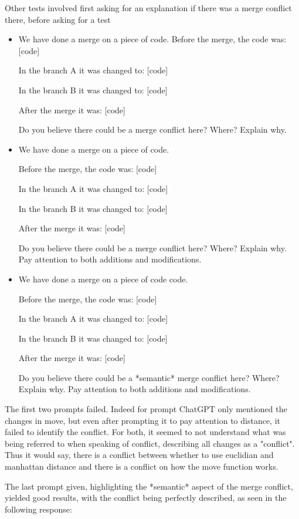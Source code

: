 Other tests involved first asking for an explanation if there was a merge conflict there, before asking for a test

\begin{itemize}
  \item We have done a merge on a piece of code.
Before the merge, the code was: [code]

In the branch A it was changed to: [code]

In the branch B it was changed to: [code]

After the merge it was: [code]

Do you believe there could be a merge conflict here? Where? Explain why.
  \item We have done a merge on a piece of code.
  
Before the merge, the code was: [code]

In the branch A it was changed to: [code]

In the branch B it was changed to: [code]

After the merge it was: [code]

Do you believe there could be a merge conflict here? Where? Explain why. Pay attention to both additions and modifications.
  \item We have done a merge on a piece of code code.
  
Before the merge, the code was: [code]

In the branch A it was changed to: [code]

In the branch B it was changed to: [code]

After the merge it was: [code]

Do you believe there could be a *semantic* merge conflict here? Where? Explain why. Pay attention to both additions and modifications.

\end{itemize}

The first two prompts failed. Indeed for prompt ChatGPT only mentioned the changes in move, but even after prompting it to pay attention to distance, it failed to identify the conflict. For both, it seemed to not understand what was being referred to when speaking of conflict, describing all changes as a "conflict". Thus it would say, there is a conflict between whether to use euclidian and manhattan distance and there is a conflict on how the move function works.

The last prompt given, highlighting the *semantic* aspect of the merge conflict, yielded good results, with the conflict being perfectly described, as seen in the following response:


